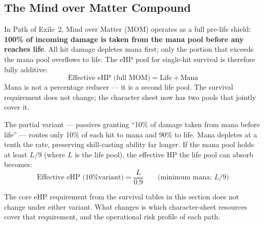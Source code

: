 \documentclass[12pt, letterpaper]{article}
\begin{document}
\subsection*{The Mind over Matter Compound}

In Path of Exile~2, Mind over Matter (MOM) operates as a full pre-life shield: \textbf{100\% of incoming damage is taken from the mana pool before any reaches life}. All hit damage depletes mana first; only the portion that exceeds the mana pool overflows to life. The eHP pool for single-hit survival is therefore fully additive:
\[
\text{Effective eHP (full MOM)} = \text{Life} + \text{Mana}
\]
Mana is not a percentage reducer --- it is a second life pool. The survival requirement does not change; the character sheet now has two pools that jointly cover it.

The partial variant --- passives granting ``10\% of damage taken from mana before life'' --- routes only 10\% of each hit to mana and 90\% to life. Mana depletes at a tenth the rate, preserving skill-casting ability far longer. If the mana pool holds at least $L/9$ (where $L$ is the life pool), the effective HP the life pool can absorb becomes:
\[
\text{Effective eHP (10\% variant)} = \frac{L}{0.9} \qquad \text{(minimum mana: } L/9\text{)}
\]

The core eHP requirement from the survival tables in this section does not change under either variant. What changes is which character-sheet resources cover that requirement, and the operational risk profile of each path.
\end{document}
